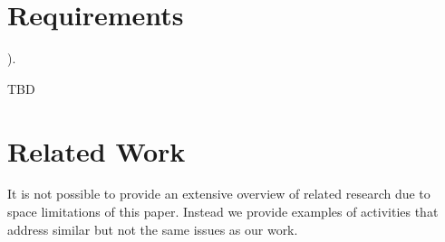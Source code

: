 \documentclass{tex/sig-alternate-2013}
\newcommand{\todo}[1]{{\color{red}{#1}}}
\begin{document}
\section{Requirements} \label{S:requirements}).


TBD


\section{Related Work}\label{S:related}

\todo{READ}

It is not possible to provide an extensive overview of related research due to space limitations of this paper. Instead we provide examples of activities that address similar but not the same issues as our work.
\end{document}
